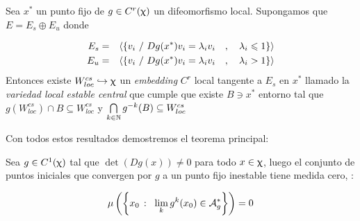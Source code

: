 
\begin{theorem}
	\label{teo: variedad local estable central}
	Sea $x^*$ un punto fijo de $g \in C^{r}(\upchi)$ un difeomorfismo local. Supongamos que $E = E_s \oplus E_u$ donde 
	
	\begin{equation*}
	\begin{aligned}
	E_s & = & \langle \left\lbrace v_i \ / \ Dg(x^*)v_i = \lambda_i v_i \quad , \quad \lambda_i \leqslant 1\right\rbrace \rangle \\
	E_u & = & \langle \left\lbrace v_i \ / \ Dg(x^*)v_i = \lambda_i v_i \quad , \quad \lambda_i > 1\right\rbrace \rangle \\
	\end{aligned}
	\end{equation*}
	Entonces existe $W_{loc}^{cs} \hookrightarrow \upchi$ un \textit{embedding} $C^r$ local tangente a $E_s$ en $x^*$ llamado la \textit{variedad local estable central} que cumple que existe $B \ni x^*$ entorno tal que $g\left(W_{loc}^{cs}\right) \cap B \subseteq W_{loc}^{cs}$ y $\bigcap\limits_{k \in {\mathbb{N}}}{g^{-k}(B)} \subseteq W_{loc}^{cs}$
\end{theorem}

Con todos estos resultados demostremos el teorema principal:

\begin{theorem}
	\label{teo: Principal}
	Sea $g \in C^1(\upchi)$ tal que $\det\left(Dg(x)\right) \neq 0$ para todo $x \in \upchi$, luego el conjunto de puntos iniciales que convergen por $g$ a un punto fijo inestable tiene medida cero, \ie:
	
	\begin{equation*}
		\mu \left(\sett{x_0 \ \colon \ \Biglim{k}{g^k(x_0) \in \mathcal{A}_g^{*}}}\right) = 0
	\end{equation*}
\end{theorem}

